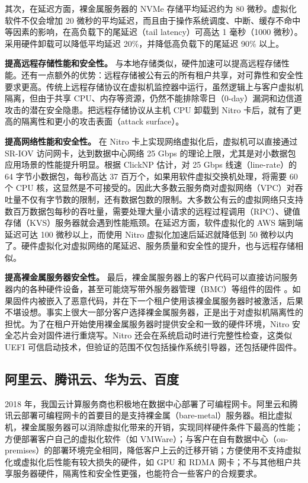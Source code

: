 其次，在延迟方面，裸金属服务器的 NVMe 存储平均延迟约为 80 微秒。虚拟化软件不仅会增加 20 微秒的平均延迟，而且由于操作系统调度、中断、缓存不命中等因素的影响，在高负载下的尾延迟（tail latency）可高达 1 毫秒（1000 微秒）。采用硬件卸载可以降低平均延迟 20\%，并降低高负载下的尾延迟 90\% 以上。

\textbf{提高远程存储性能和安全性。}
与本地存储类似，硬件加速可以提高远程存储性能。还有一点额外的优势：远程存储被公有云的所有租户共享，对可靠性和安全性要求更高。传统上远程存储协议在虚拟机监控器中运行，虽然逻辑上与客户虚拟机隔离，但由于共享 CPU、内存等资源，仍然不能排除零日（0-day）漏洞和边信道攻击的潜在安全隐患。把远程存储协议从主机 CPU 卸载到 Nitro 卡后，就有了更高的隔离性和更小的攻击表面（attack surface）。

\textbf{提高网络性能和安全性。}
在 Nitro 卡上实现网络虚拟化后，虚拟机可以直接通过 SR-IOV 访问网卡，达到数据中心网络 25 Gbps 的理论上限，尤其是对小数据包应用场景的性能提升明显。根据 ClickNP \cite{li2016clicknp} 估计，对 25 Gbps 线速（line-rate）的 64 字节小数据包，每秒高达 37 百万个，如果用软件虚拟交换机处理，将需要 60 个 CPU 核，这显然是不可接受的。因此大多数云服务商对虚拟网络（VPC）对吞吐量不仅有字节数的限制，还有数据包数的限制。大多数公有云的虚拟网络只支持数百万数据包每秒的吞吐量，需要处理大量小请求的远程过程调用（RPC）、键值存储（KVS）服务器就会遇到性能瓶颈。在延迟方面，软件虚拟化的 AWS 端到端延迟可达 100 微秒以上，而使用 Nitro 虚拟化加速后延迟就降低到 50 微秒以内了。硬件虚拟化对虚拟网络的尾延迟、服务质量和安全性的提升，也与远程存储相似。

\textbf{提高裸金属服务器安全性。}
最后，裸金属服务器上的客户代码可以直接访问服务器内的各种硬件设备，甚至可能烧写带外服务器管理（BMC）等组件的固件 \cite{bare-metal-security}。如果固件内被嵌入了恶意代码，并在下一个租户使用该裸金属服务器时被激活，后果不堪设想。事实上很大一部分客户选择裸金属服务器，正是出于对虚拟机隔离性的担忧。为了在租户开始使用裸金属服务器时提供安全和一致的硬件环境，Nitro 安全芯片会对固件进行重烧写。Nitro 还会在系统启动时进行完整性检查，这类似 UEFI 可信启动技术，但验证的范围不仅包括操作系统引导器，还包括硬件固件。

\subsection{阿里云、腾讯云、华为云、百度}

2018 年，我国云计算服务商也积极地在数据中心部署了可编程网卡。阿里云和腾讯云部署可编程网卡的首要目的是支持裸金属（bare-metal）服务器。相比虚拟机，裸金属服务器可以消除虚拟化带来的开销，实现同样硬件条件下最高的性能；方便部署客户自己的虚拟化软件（如 VMWare）；与客户在自有数据中心（on-premises）的部署环境完全相同，降低客户上云的迁移开销；方便使用不支持虚拟化或虚拟化后性能有较大损失的硬件，如 GPU 和 RDMA 网卡；不与其他租户共享服务器硬件，隔离性和安全性更强，也能符合一些客户的合规要求。

